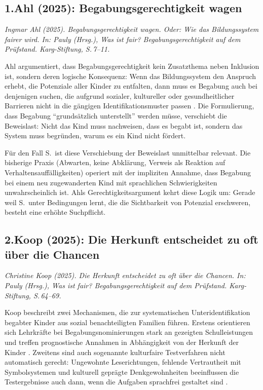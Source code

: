 \documentclass[ngerman, a4paper]{article}
\begin{document}
\subsection*{1.\quad Ahl (2025): Begabungsgerechtigkeit wagen}

\textit{Ingmar Ahl (2025). Begabungsgerechtigkeit wagen. Oder: Wie das
  Bildungssystem fairer wird. In: Pauly (Hrsg.), Was ist fair?
  Begabungsgerechtigkeit auf dem Prüfstand. Karg-Stiftung, S.\,7--11.}

\medskip
Ahl argumentiert, dass Begabungsgerechtigkeit kein Zusatzthema neben Inklusion
ist, sondern deren logische Konsequenz: Wenn das Bildungssystem den Anspruch
erhebt, die Potenziale aller Kinder zu entfalten, dann muss es Begabung auch bei
denjenigen suchen, die aufgrund sozialer, kultureller oder gesundheitlicher
Barrieren nicht in die gängigen Identifikationsmuster passen
\parencite[S.\,8--9]{ahl2025begabungsgerechtigkeit}. Die Formulierung, dass
Begabung \enquote{grundsätzlich unterstellt} werden müsse, verschiebt die
Beweislast: Nicht das Kind muss nachweisen, dass es begabt ist, sondern das
System muss begründen, warum es ein Kind nicht fördert.

Für den Fall S.\ ist diese Verschiebung der Beweislast unmittelbar relevant. Die
bisherige Praxis (Abwarten, keine Abklärung, Verweis als Reaktion auf
Verhaltensauffälligkeiten) operiert mit der impliziten Annahme, dass Begabung
bei einem neu zugewanderten Kind mit sprachlichen Schwierigkeiten
unwahrscheinlich ist. Ahls Gerechtigkeitsargument kehrt diese Logik um: Gerade
weil S.\ unter Bedingungen lernt, die die Sichtbarkeit von Potenzial erschweren,
besteht eine erhöhte Suchpflicht.


\subsection*{2.\quad Koop (2025): Die Herkunft entscheidet zu oft über die Chancen}

\textit{Christine Koop (2025). Die Herkunft entscheidet zu oft über die Chancen.
  In: Pauly (Hrsg.), Was ist fair? Begabungsgerechtigkeit auf dem Prüfstand.
  Karg-Stiftung, S.\,64--69.}

\medskip
Koop beschreibt zwei Mechanismen, die zur systematischen Unteridentifikation
begabter Kinder aus sozial benachteiligten Familien führen. Erstens orientieren
sich Lehrkräfte bei Begabungsnominierungen stark an gezeigten Schulleistungen
und treffen prognostische Annahmen in Abhängigkeit von der Herkunft der Kinder
\parencite[S.\,66]{koop2025herkunft}. Zweitens sind auch sogenannte
kulturfaire Testverfahren nicht automatisch gerecht: Ungewohnte
Leserichtungen, fehlende Vertrautheit mit Symbolsystemen und kulturell
geprägte Denkgewohnheiten beeinflussen die Testergebnisse auch dann, wenn die
Aufgaben sprachfrei gestaltet sind \parencite[S.\,66]{koop2025herkunft}.
\end{document}
